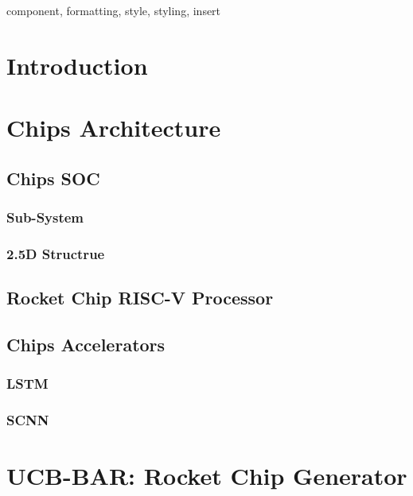 \maketitle

\begin{abstract}
\blindtext
\end{abstract}

\begin{IEEEkeywords}
component, formatting, style, styling, insert
\end{IEEEkeywords}
\section{Introduction}
\blindtext 

\blindtext

\section{Chips Architecture}
\blindtext

\subsection{Chips SOC}
\blindtext
\subsubsection{Sub-System}
\blindtext
\subsubsection{2.5D Structrue}
\blindtext
\subsection{Rocket Chip RISC-V Processor}
\blindtext
\subsection{Chips Accelerators}
\subsubsection{LSTM}
\blindtext
\subsubsection{SCNN}
\blindtext

\section{UCB-BAR: Rocket Chip Generator}
\blindtext
